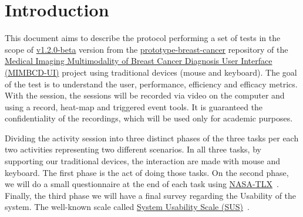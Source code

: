 
\section{Introduction}

This document aims to describe the protocol performing a set of tests in the scope of \hyperlink{https://github.com/MIMBCD-UI/prototype-breast-screening/releases/tag/v1.2.0-beta}{v1.2.0-beta} version from the \hyperlink{https://github.com/MIMBCD-UI/prototype-breast-cancer}{prototype-breast-cancer} repository of the \hyperlink{https://mimbcd-ui.github.io/}{Medical Imaging Multimodality of Breast Cancer Diagnosis User Interface (MIMBCD-UI)} project using traditional devices (mouse and keyboard). The goal of the test is to understand the user, performance, efficiency and efficacy metrics. With the session, the sessions will be recorded via video on the computer and using a record, heat-map and triggered event tools. It is guaranteed the confidentiality of the recordings, which will be used only for academic purposes.

Dividing the activity session into three distinct phases of the three tasks per each two activities representing two different scenarios. In all three tasks, by supporting our traditional devices, the interaction are made with mouse and keyboard. The first phase is the act of doing those tasks. On the second phase, we will do a small questionnaire at the end of each task using \hyperlink{https://en.wikipedia.org/wiki/NASA-TLX}{NASA-TLX}~\cite{ramkumar2017using}. Finally, the third phase we will have a final survey regarding the Usability of the system. The well-known scale called \hyperlink{https, therefore, support this phase://en.wikipedia.org/wiki/System_usability_scale}{System Usability Scale (SUS)}~\cite{orfanou2015perceived}.